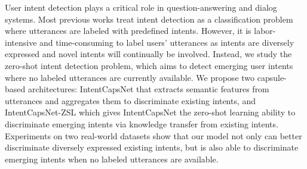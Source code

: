 User intent detection plays a critical role in question-answering and dialog systems. Most previous works treat intent detection as a classification problem where utterances are labeled with predefined intents. However, it is labor-intensive and time-consuming to label users' utterances as intents are diversely expressed and novel intents will continually be involved. Instead, we study the zero-shot intent detection problem, which aims to detect emerging user intents where no labeled utterances are currently available. We propose two capsule-based architectures: IntentCapsNet that extracts semantic features from utterances and aggregates them to discriminate existing intents, and IntentCapsNet-ZSL which gives IntentCapsNet the zero-shot learning ability to discriminate emerging intents via knowledge transfer from existing intents. Experiments on two real-world datasets show that our model not only can better discriminate diversely expressed existing intents, but is also able to discriminate emerging intents when no labeled utterances are available.
